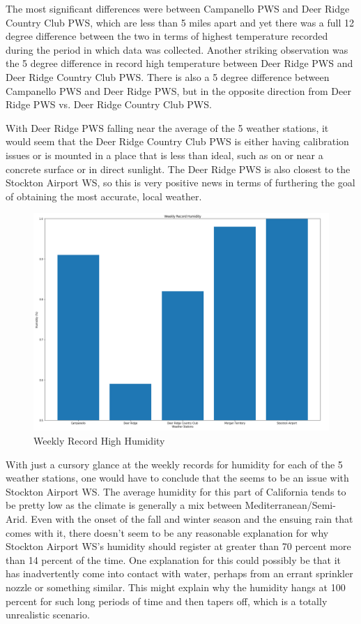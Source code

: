 \documentclass[sigconf]{acmart}
\begin{document}
The most significant differences were between Campanello PWS and Deer Ridge Country Club PWS, which are less than 5 miles apart and yet there was a full 12 degree difference between the two in terms of highest temperature recorded during the period in which data was collected. Another striking observation was the 5 degree difference in record high temperature between Deer Ridge PWS and Deer Ridge Country Club PWS. There is also a 5 degree difference between Campanello PWS and Deer Ridge PWS, but in the opposite direction from Deer Ridge PWS vs. Deer Ridge Country Club PWS. 

With Deer Ridge PWS falling near the average of the 5 weather stations, it would seem that the Deer Ridge Country Club PWS is either having calibration issues or is mounted in a place that is less than ideal, such as on or near a concrete surface or in direct sunlight. The Deer Ridge PWS is also closest to the Stockton Airport WS, so this is very positive news in terms of furthering the goal of obtaining the most accurate, local weather.

\begin{figure}[htb]
    \centering
    \includegraphics[width=\columnwidth]{images/WK_REC_HUM.PNG}
    \caption{Weekly Record High Humidity}
\end{figure}

With just a cursory glance at the weekly records for humidity for each of the 5 weather stations, one would have to conclude that the seems to be an issue with Stockton Airport WS. The average humidity for this part of California tends to be pretty low as the climate is generally a mix between Mediterranean/Semi-Arid. Even with the onset of the fall and winter season and the ensuing rain that comes with it, there doesn't seem to be any reasonable explanation for why Stockton Airport WS's humidity should register at greater than 70 percent more than 14 percent of the time. One explanation for this could possibly be that it has inadvertently come into contact with water, perhaps from an errant sprinkler nozzle or something similar. This might explain why the humidity hangs at 100 percent for such long periods of time and then tapers off, which is a totally unrealistic scenario. 
\end{document}
